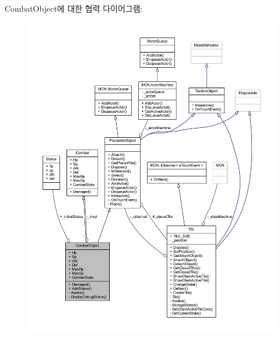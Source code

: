 Combat\+Object에 대한 협력 다이어그램\+:
\nopagebreak
\begin{figure}[H]
\begin{center}
\leavevmode
\includegraphics[width=350pt]{class_combat_object__coll__graph}
\end{center}
\end{figure}
